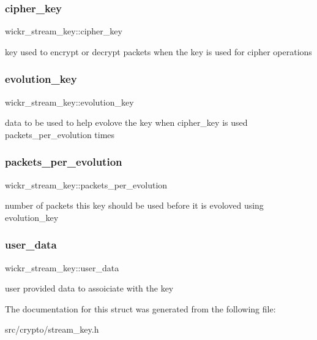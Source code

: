 \subsubsection{\texorpdfstring{cipher\+\_\+key}{cipher\_key}}
{\footnotesize\ttfamily wickr\+\_\+stream\+\_\+key\+::cipher\+\_\+key}

key used to encrypt or decrypt packets when the key is used for cipher operations \mbox{\label{structwickr__stream__key_ae7210bd67e61cb4c38733a237dae95d9}} 
\subsubsection{\texorpdfstring{evolution\+\_\+key}{evolution\_key}}
{\footnotesize\ttfamily wickr\+\_\+stream\+\_\+key\+::evolution\+\_\+key}

data to be used to help evolove the key when \textquotesingle{}cipher\+\_\+key\textquotesingle{} is used \textquotesingle{}packets\+\_\+per\+\_\+evolution\textquotesingle{} times \mbox{\label{structwickr__stream__key_a78777e4c64048b6dae38f8772744194e}} 
\subsubsection{\texorpdfstring{packets\+\_\+per\+\_\+evolution}{packets\_per\_evolution}}
{\footnotesize\ttfamily wickr\+\_\+stream\+\_\+key\+::packets\+\_\+per\+\_\+evolution}

number of packets this key should be used before it is evoloved using \textquotesingle{}evolution\+\_\+key\textquotesingle{} \mbox{\label{structwickr__stream__key_a51e59da9f7fbb0b3e1332a20252d1cc6}} 
\subsubsection{\texorpdfstring{user\+\_\+data}{user\_data}}
{\footnotesize\ttfamily wickr\+\_\+stream\+\_\+key\+::user\+\_\+data}

user provided data to assoiciate with the key 

The documentation for this struct was generated from the following file\+:\begin{DoxyCompactItemize}
\item 
src/crypto/stream\+\_\+key.\+h\end{DoxyCompactItemize}

